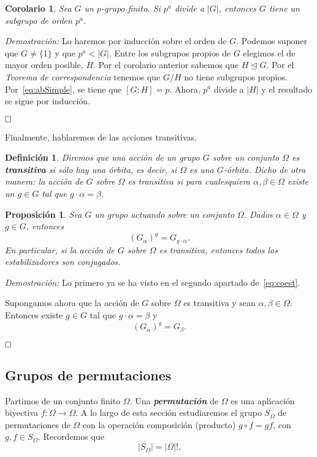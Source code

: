 \documentclass[12pt]{article}
\newtheorem{proposition}[theorem]{Proposición}
\newtheorem{definition}[theorem]{Definición}
\newtheorem{corolario}{Corolario}[theorem]
\begin{document}
\begin{corolario}\label{eq:cor412} Sea $G$ un $p$-grupo finito. Si $p^a$ divide a $|G|$, entonces $G$ tiene un subgrupo de orden $p^a$.
\end{corolario}
\emph{Demostración: }Lo haremos por inducción sobre el orden de $G$. Podemos suponer que $G \neq \lbrace 1 \rbrace$ y que $p^a < |G|$. Entre los subgrupos propios de $G$ elegimos el de mayor orden posible, $H$. Por el corolario anterior sabemos que $H \unlhd G$. Por el \textit{Teorema de correspondencia} tenemos que $G/H$ no tiene subgrupos propios. Por~\ref{eq:abSimple}, se tiene que $[G:H] = p$. Ahora, $p^a$ divide a $|H|$ y el resultado se sigue por inducción.

$\hfill \square$

Finalmente, hablaremos de las acciones transitivas.

\begin{definition}Diremos que una acción de un grupo $G$ sobre un conjunto $\Omega$ es \textbf{transitiva} si sólo hay una órbita, es decir, si $\Omega$ es una $G$-órbita. Dicho de otra manera: la acción de $G$ sobre $\Omega$ es transitiva si para cualesquiera $\alpha, \beta \in \Omega$ existe un $g \in G$ tal que $g \cdot \alpha = \beta$.
\end{definition}

\begin{proposition}Sea $G$ un grupo actuando sobre un conjunto $\Omega$. Dados $\alpha \in \Omega$ y $g \in G$, entonces $$(G_\alpha)^g = G_{g\cdot \alpha}.$$ En particular, si la acción de $G$ sobre $\Omega$ es transitiva, entonces todos los estabilizadores son conjugados.
\end{proposition}
\emph{Demostración: }Lo primero ya se ha visto en el segundo apartado de~\ref{eq:coest}.

Supongamos ahora que la acción de $G$ sobre $\Omega$ es transitiva y sean $\alpha, \beta \in \Omega$. Entonces existe $g \in G$ tal que $g \cdot \alpha = \beta$ y $$(G_\alpha)^g = G_\beta.$$

$\hfill \square$

\subsection{Grupos de permutaciones}

Partimos de un conjunto finito $\Omega$. Una \textbf{\textit{permutación}} de $\Omega$ es una aplicación biyectiva $f \colon \Omega \longrightarrow \Omega$. A lo largo de esta sección estudiaremos el grupo $S_\Omega$ de permutaciones de $\Omega$ con la operación composición (producto) $g \circ f = gf$, con $g,f \in S_\Omega$. Recordemos que $$|S_\Omega| = |\Omega|!.$$
\end{document}
